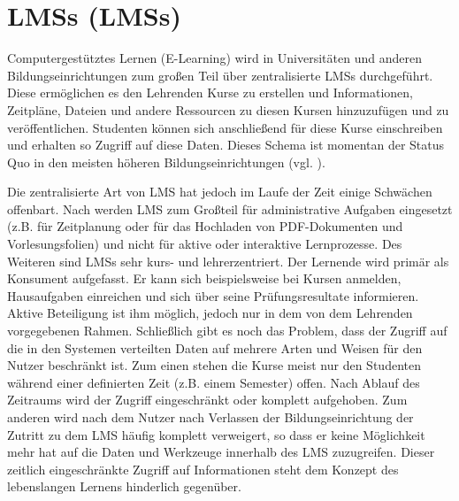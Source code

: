 \section{\aclp{LMS} (\acsp{LMS})}\label{section:lms}
Computergestütztes Lernen (E-Learning) wird in Universitäten und anderen Bildungseinrichtungen zum großen Teil über zentralisierte \acp{LMS} durchgeführt. Diese ermöglichen es den Lehrenden Kurse zu erstellen und Informationen, Zeitpläne, Dateien und andere Ressourcen zu diesen Kursen hinzuzufügen und zu veröffentlichen. Studenten können sich anschließend für diese Kurse einschreiben und erhalten so Zugriff auf diese Daten. Dieses Schema ist momentan der Status Quo in den meisten höheren Bildungseinrichtungen (vgl. \cite{Mott2010}). 

Die zentralisierte Art von \ac{LMS} hat jedoch im Laufe der Zeit einige Schwächen offenbart. Nach \cite{Mott2010} werden \acs{LMS} zum Großteil für administrative Aufgaben eingesetzt (z.B. für Zeitplanung oder für das Hochladen von PDF-Dokumenten und Vorlesungsfolien) und nicht für aktive oder interaktive Lernprozesse. Des Weiteren sind \acp{LMS} sehr kurs- und lehrerzentriert. Der Lernende wird primär als Konsument aufgefasst. Er kann sich beispielsweise bei Kursen anmelden, Hausaufgaben einreichen und sich über seine Prüfungsresultate informieren. Aktive Beteiligung ist ihm möglich, jedoch nur in dem von dem Lehrenden vorgegebenen Rahmen.
Schließlich gibt es noch das Problem, dass der Zugriff auf die in den Systemen verteilten Daten auf mehrere Arten und Weisen für den Nutzer beschränkt ist. Zum einen stehen die Kurse meist nur den Studenten während einer definierten Zeit (z.B. einem Semester) offen. Nach Ablauf des Zeitraums wird der Zugriff eingeschränkt oder komplett aufgehoben. Zum anderen wird nach \cite{Schaffert2008a} dem Nutzer nach Verlassen der Bildungseinrichtung der Zutritt zu dem \ac{LMS} häufig komplett verweigert, so dass er keine Möglichkeit mehr hat auf die Daten und Werkzeuge innerhalb des \ac{LMS} zuzugreifen. Dieser zeitlich eingeschränkte Zugriff auf Informationen steht dem Konzept des lebenslangen Lernens hinderlich gegenüber.

